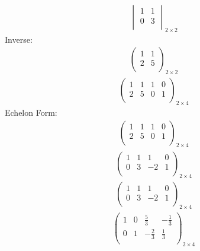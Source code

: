 \documentclass{article}
\begin{document}
\begin{align*}
\begin{vmatrix}
1 & 1\\
0 & 3\\
\end{vmatrix}_{2\times 2}
\end{align*}
Inverse:\\
\begin{align*}
\begin{pmatrix}
1 & 1\\
2 & 5\\
\end{pmatrix}_{2\times 2}
\end{align*}
\begin{align*}
\left(
\begin{array}{cc|cc}
1 & 1 & 1 & 0\\
2 & 5 & 0 & 1\\
\end{array}
\right)_{2\times 4}
\end{align*}
Echelon Form:\\
\begin{align*}
\left(
\begin{array}{cc|cc}
1 & 1 & 1 & 0\\
2 & 5 & 0 & 1\\
\end{array}
\right)_{2\times 4}
\end{align*}
\begin{align*}
\left(
\begin{array}{cc|cc}
1 & 1 & 1 & 0\\
0 & 3 & -2 & 1\\
\end{array}
\right)_{2\times 4}
\end{align*}
\begin{align*}
\left(
\begin{array}{cc|cc}
1 & 1 & 1 & 0\\
0 & 3 & -2 & 1\\
\end{array}
\right)_{2\times 4}
\end{align*}
\begin{align*}
\left(
\begin{array}{cc|cc}
1 & 0 & \frac{5}{3} & -\frac{1}{3}\\
0 & 1 & -\frac{2}{3} & \frac{1}{3}\\
\end{array}
\right)_{2\times 4}
\end{align*}
\end{document}
